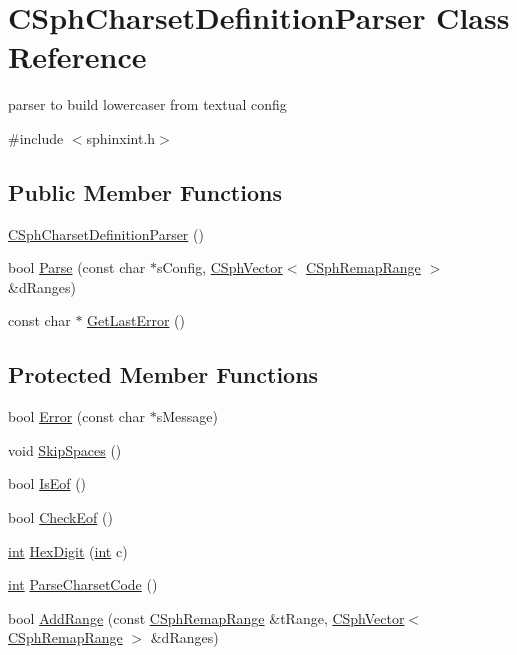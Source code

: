 \hypertarget{classCSphCharsetDefinitionParser}{\section{C\-Sph\-Charset\-Definition\-Parser Class Reference}
\label{classCSphCharsetDefinitionParser}
}


parser to build lowercaser from textual config  




{\ttfamily \#include $<$sphinxint.\-h$>$}

\subsection*{Public Member Functions}
\begin{DoxyCompactItemize}
\item 
\hyperlink{classCSphCharsetDefinitionParser_acfdc09c25c1b037d3e8ee7d73282438c}{C\-Sph\-Charset\-Definition\-Parser} ()
\item 
bool \hyperlink{classCSphCharsetDefinitionParser_a4942cc2c817ff35acec6b6c29853fcc0}{Parse} (const char $\ast$s\-Config, \hyperlink{classCSphVector}{C\-Sph\-Vector}$<$ \hyperlink{structCSphRemapRange}{C\-Sph\-Remap\-Range} $>$ \&d\-Ranges)
\item 
const char $\ast$ \hyperlink{classCSphCharsetDefinitionParser_af0f986416c2689526c1e45a05496dc8d}{Get\-Last\-Error} ()
\end{DoxyCompactItemize}
\subsection*{Protected Member Functions}
\begin{DoxyCompactItemize}
\item 
bool \hyperlink{classCSphCharsetDefinitionParser_a653dbea8ef9ab50644ed5fe3976d81fb}{Error} (const char $\ast$s\-Message)
\item 
void \hyperlink{classCSphCharsetDefinitionParser_a1989bace348c4aaa644be356ab49a466}{Skip\-Spaces} ()
\item 
bool \hyperlink{classCSphCharsetDefinitionParser_a4cad7378b881dd7ea573c93bb905dbab}{Is\-Eof} ()
\item 
bool \hyperlink{classCSphCharsetDefinitionParser_af666bafec3d7eacc68ef8e8f7e70e039}{Check\-Eof} ()
\item 
\hyperlink{sphinxexpr_8cpp_a4a26e8f9cb8b736e0c4cbf4d16de985e}{int} \hyperlink{classCSphCharsetDefinitionParser_acf0ff78b5678c12e9c3ae56fc77e9c0e}{Hex\-Digit} (\hyperlink{sphinxexpr_8cpp_a4a26e8f9cb8b736e0c4cbf4d16de985e}{int} c)
\item 
\hyperlink{sphinxexpr_8cpp_a4a26e8f9cb8b736e0c4cbf4d16de985e}{int} \hyperlink{classCSphCharsetDefinitionParser_a7dc727637b2e0b80b9936525e5a9dfbb}{Parse\-Charset\-Code} ()
\item 
bool \hyperlink{classCSphCharsetDefinitionParser_a9544a3f68ddac29fd7ebb7f3b814b6bb}{Add\-Range} (const \hyperlink{structCSphRemapRange}{C\-Sph\-Remap\-Range} \&t\-Range, \hyperlink{classCSphVector}{C\-Sph\-Vector}$<$ \hyperlink{structCSphRemapRange}{C\-Sph\-Remap\-Range} $>$ \&d\-Ranges)
\end{DoxyCompactItemize}
